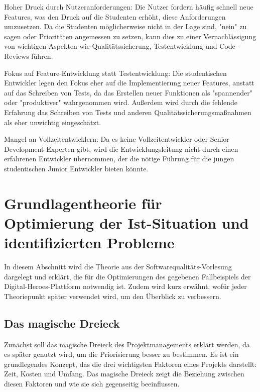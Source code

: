 Hoher Druck durch Nutzeranforderungen: Die Nutzer fordern häufig schnell neue Features, 
was den Druck auf die Studenten erhöht, diese Anforderungen umzusetzen. 
Da die Studenten möglicherweise nicht in der Lage sind, 
"nein" zu sagen oder Prioritäten angemessen zu setzen, 
kann dies zu einer Vernachlässigung von wichtigen Aspekten wie Qualitätssicherung, 
Testentwicklung und Code-Reviews führen. 

Fokus auf Feature-Entwicklung statt Testentwicklung: Die studentischen Entwickler legen den Fokus eher auf 
die Implementierung neuer Features, anstatt auf das Schreiben von Tests, 
da das Erstellen neuer Funktionen als "spannender" oder "produktiver" wahrgenommen wird. 
Außerdem wird durch die fehlende Erfahrung das Schreiben von Tests und anderen 
Qualitätssicherungsmaßnahmen als eher unwichtig eingeschätzt. 

Mangel an Vollzeitentwicklern: Da es keine Vollzeitentwickler oder Senior Development-Experten gibt,
wird die Entwicklungsleitung nicht durch einen erfahrenen Entwickler übernommen, 
der die nötige Führung für die jungen studentischen Junior Entwickler bieten könnte.

\section{Grundlagentheorie für Optimierung der Ist-Situation und identifizierten Probleme}

In diesem Abschnitt wird die Theorie aus der Softwarequalitäts-Vorlesung 
dargelegt und erklärt, die für die Optimierungen des gegebenen 
Fallbeispiels der Digital-Heroes-Plattform notwendig ist. 
Zudem wird kurz erwähnt, wofür jeder Theoriepunkt später verwendet wird, 
um den Überblick zu verbessern. 

\subsection*{Das magische Dreieck}

Zunächst soll das magische Dreieck des Projektmanagements erklärt werden, 
da es später genutzt wird, um die Priorisierung besser zu bestimmen. Es ist ein grundlegendes Konzept, 
das die drei wichtigsten Faktoren eines Projekts darstellt: Zeit, Kosten und Umfang. 
Das magische Dreieck zeigt die Beziehung zwischen diesen Faktoren und wie sie sich gegenseitig beeinflussen.


